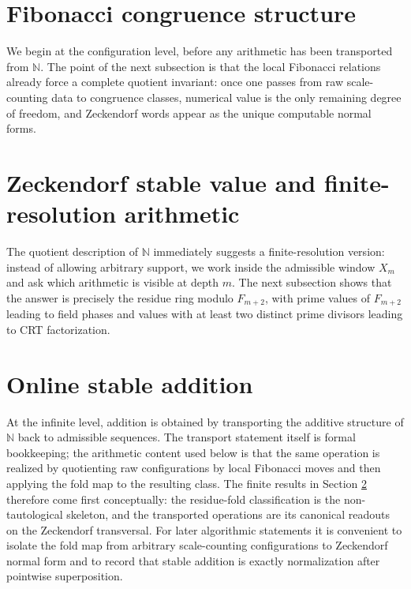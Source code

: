 \documentclass[12pt,a4paper]{article}
\theoremstyle{plain}
\theoremstyle{definition}
\numberwithin{equation}{section}
\newcommand{\NN}{\mathbb{N}}
\begin{document}
\section{Fibonacci congruence structure}\label{sec:fib-congruence}

We begin at the configuration level, before any arithmetic has been transported from \(\NN\). The point of the next subsection is that the local Fibonacci relations already force a complete quotient invariant: once one passes from raw scale-counting data to congruence classes, numerical value is the only remaining degree of freedom, and Zeckendorf words appear as the unique computable normal forms.



\section{Zeckendorf stable value and finite-resolution arithmetic}\label{sec:stable-value}

The quotient description of \(\NN\) immediately suggests a finite-resolution version: instead of allowing arbitrary support, we work inside the admissible window \(X_m\) and ask which arithmetic is visible at depth \(m\). The next subsection shows that the answer is precisely the residue ring modulo \(F_{m+2}\), with prime values of \(F_{m+2}\) leading to field phases and values with at least two distinct prime divisors leading to CRT factorization.



\section{Online stable addition}\label{sec:stable-add}

At the infinite level, addition is obtained by transporting the additive structure of \(\NN\) back to admissible sequences. The transport statement itself is formal bookkeeping; the arithmetic content used below is that the same operation is realized by quotienting raw configurations by local Fibonacci moves and then applying the fold map to the resulting class. The finite results in Section \ref{sec:stable-value} therefore come first conceptually: the residue-fold classification is the non-tautological skeleton, and the transported operations are its canonical readouts on the Zeckendorf transversal. For later algorithmic statements it is convenient to isolate the fold map from arbitrary scale-counting configurations to Zeckendorf normal form and to record that stable addition is exactly normalization after pointwise superposition.
\end{document}
